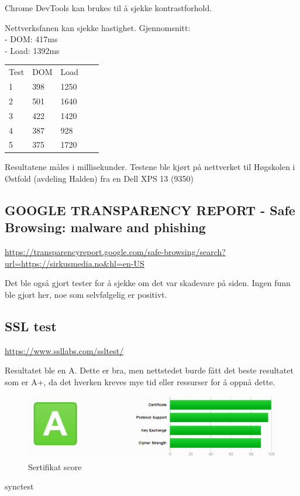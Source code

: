 Chrome DevTools kan brukes til å sjekke kontrastforhold.

Nettverksfanen kan sjekke hastighet.
Gjennomsnitt:\\
- DOM: 417ms\\
- Load: 1392ms

\begin{table}[H]
\begin{tabular}{lllll}
Test & DOM & Load &  &  \\
1 & 398 & 1250 &  &  \\
2 & 501 & 1640 &  &  \\
3 & 422 & 1420 &  &  \\
4 & 387 &  928 &  &  \\
5 & 375 & 1720 &  & 
\end{tabular}
\end{table}

Resultatene måles i millisekunder. Testene ble kjørt på nettverket til Høgskolen i Østfold (avdeling Halden) fra en Dell XPS 13 (9350)

\subsection{GOOGLE TRANSPARENCY REPORT - Safe Browsing: malware and phishing}
\url{https://transparencyreport.google.com/safe-browsing/search?url=https://sirkusmedia.no&hl=en-US}

Det ble også gjort tester for å sjekke om det var skadevare på siden.
Ingen funn ble gjort her, noe som selvfølgelig er positivt.

\subsection{SSL test}

\url{https://www.ssllabs.com/ssltest/}

Resultatet ble en A. Dette er bra, men nettstedet burde fått det beste resultatet som er A+, da det hverken kreves mye tid eller ressurser for å oppnå dette.

\begin{figure}[H]
    \centering
    \includegraphics[width=\textwidth]{bjornar/ssllabs.png}
    \caption{Sertifikat score}
    \label{fig:analysis-current-ssl}
\end{figure}

synctest

\clearpage